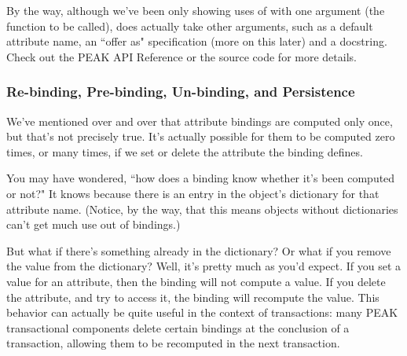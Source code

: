 \begin{verbatim%
}
\begin{verbatim%
}
\begin{verbatim%
}
\begin{verbatim%
}
\begin{verbatim%
}
\begin{verbatim%
}
\begin{verbatim%
}
\begin{verbatim%
}
\begin{verbatim%
}
By the way, although we've been only showing uses of  with
one argument (the function to be called),  does actually
take other arguments, such as a default attribute name, an ``offer as"
specification (more on this later) and a docstring.  Check out the PEAK
API Reference or the source code for more details.

































\subsubsection{Re-binding, Pre-binding, Un-binding, and Persistence}

We've mentioned over and over that attribute bindings are computed only once,
but that's not precisely true.  It's actually possible for them to be computed
zero times, or many times, if we set or delete the attribute the binding
defines.

You may have wondered, ``how does a binding know whether it's been computed or
not?"  It knows because there is an entry in the object's dictionary for that
attribute name.  (Notice, by the way, that this means objects without
dictionaries can't get much use out of bindings.)

But what if there's something already in the dictionary?  Or what if you remove
the value from the dictionary?  Well, it's pretty much as you'd expect.  If you
set a value for an attribute, then the binding will not compute a value.  If
you delete the attribute, and try to access it, the binding will recompute the
value.  This behavior can actually be quite useful in the context of
transactions: many PEAK transactional components delete certain bindings at the
conclusion of a transaction, allowing them to be recomputed in the next
transaction.


\end{verbatim%
}
\end{verbatim%
}
\end{verbatim%
}
\end{verbatim%
}
\end{verbatim%
}
\end{verbatim%
}
\end{verbatim%
}
\end{verbatim%
}
\end{verbatim%
}
